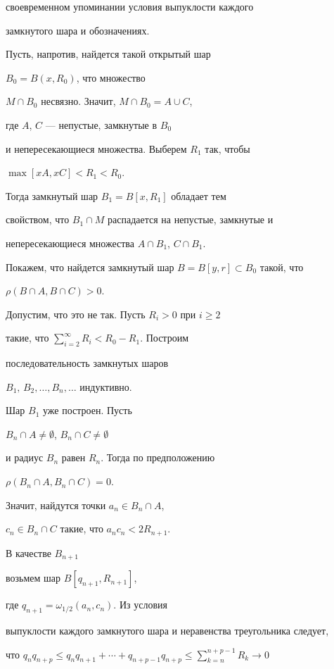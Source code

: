 своевременном упоминании условия выпуклости каждого 


замкнутого шара и обозначениях.


Пусть, напротив, найдется такой открытый шар


$B_{0} = B(x,R_{0})$, что множество 


$M\cap B_{0}$ несвязно. Значит, $M\cap B_{0} = A\cup C$,


где $A$, $C$ --- непустые, замкнутые в $B_{0}$ 


и непересекающиеся множества. Выберем $R_{1}$ так, чтобы 


$\max [xA,xC] < R_{1} < R_{0}$.


Тогда замкнутый шар $B_{1} = B[x,R_{1}]$ обладает тем 


свойством, что $B_{1}\cap M$ распадается на непустые, замкнутые и 


непересекающиеся множества $A\cap B_{1}$, $C\cap B_{1}$. 


Покажем, что найдется замкнутый шар $B = B[y,r]\subset B_{0}$ такой, что 


$\rho (B\cap A,B\cap C) > 0$.


Допустим, что это не так. Пусть $R_{i} > 0$ при $i \geq 2$


такие, что $\sum \limits_{i=2}^{\infty }{R_{i}} < R_{0} - R_{1}$. Построим


последовательность замкнутых шаров


$B_{1}, \, B_{2}, \dotsc, B_{n}, \dotsc$ индуктивно.


Шар $B_{1}$ уже построен. Пусть


$B_{n}\cap A \neq \emptyset$, $B_{n}\cap C \neq \emptyset$ 


и радиус $B_{n}$ равен $R_{n}$. Тогда по предположению 


$\rho (B_{n}\cap A,B_{n}\cap C) = 0$.


Значит, найдутся точки $a_{n} \in B_{n}\cap A$,


$c_{n} \in B_{n}\cap C$ такие, что $a_{n}c_{n} < 2R_{n+1}$.


В качестве $B_{n+1}$


возьмем шар $B[q_{n+1},R_{n+1}]$,


где $q_{n+1} = \omega _{1/2}(a_{n},c_{n})$. Из условия 


выпуклости каждого замкнутого шара и неравенства треугольника следует,


что $q_{n}q_{n+p} \leq q_{n}q_{n+1} + \dotsb + q_{n+p-1}q_{n+p} \leq 


\sum \limits_{k=n}^{n+p-1}{R_{k}} \rightarrow 0$


